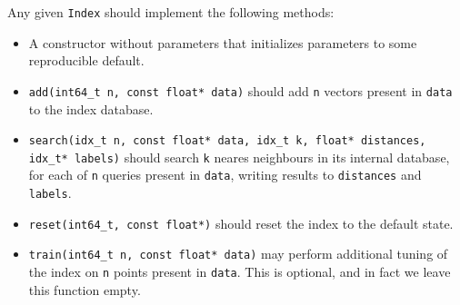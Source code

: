 Any given \texttt{Index} should implement the following methods:
\begin{itemize}

\item A constructor without parameters that initializes parameters to some reproducible default.

\item \texttt{add(int64\_t n, const float* data)} 
should add \texttt{n} vectors present in \texttt{data} to the index database.

\item \texttt{search(idx\_t n, const float* data, idx\_t k, float* distances, idx\_t* labels)} 
should search \texttt{k} neares neighbours 
in its internal database, for each of \texttt{n} queries present in \texttt{data}, writing results to \texttt{distances} and \texttt{labels}.

\item \texttt{reset(int64\_t, const float*)} 
should reset the index to the default state.

\item \texttt{train(int64\_t n, const float* data)} 
may perform additional tuning of the index on \texttt{n} points present in \texttt{data}. This is
optional, and in fact we leave this function empty.

\end{itemize}
